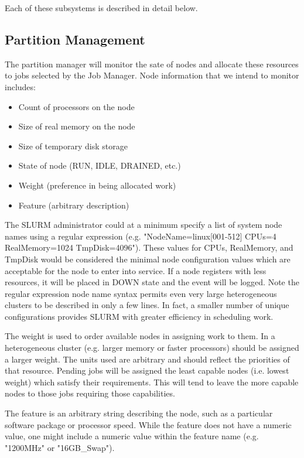 Each of these subsystems is described in detail below.

\subsection{Partition Management}

The partition manager will monitor the sate of nodes and allocate 
these resources to jobs selected by the Job Manager. 
Node information that we intend to monitor includes:

\begin{itemize}
\item Count of processors on the node
\item Size of real memory on the node
\item Size of temporary disk storage
\item State of node (RUN, IDLE, DRAINED, etc.)
\item Weight (preference in being allocated work)
\item Feature (arbitrary description)
\end{itemize}

The SLURM administrator could at a minimum specify a list of system node 
names using a regular expression (e.g. "NodeName=linux[001-512] CPUs=4 
RealMemory=1024 TmpDisk=4096"). 
These values for CPUs, RealMemory, and TmpDisk would be considered the 
minimal node configuration values which are acceptable for the node to 
enter into service. 
If a node registers with less resources, it will be placed in DOWN 
state and the event will be logged. 
Note the regular expression node name syntax permits even very large heterogeneous 
clusters to be described in only a few lines. 
In fact, a smaller number of unique configurations provides SLURM with 
greater efficiency in scheduling work.

The weight is used to order available nodes in assigning work to them. 
In a heterogeneous cluster (e.g. larger memory or faster processors) 
should be assigned a larger weight. 
The units used are arbitrary and should reflect the priorities of that resource. 
Pending jobs will be assigned the least capable nodes (i.e. lowest 
weight) which satisfy their requirements. 
This will tend to leave the more capable nodes to those jobs requiring 
those capabilities. 

The feature is an arbitrary string describing the node, such as a 
particular software package or processor speed. 
While the feature does not have a numeric value, one might include a numeric 
value within the feature name (e.g. "1200MHz" or "16GB\_Swap").

